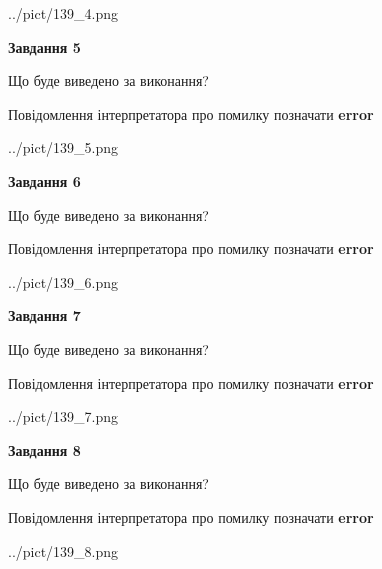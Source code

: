 \documentclass[12pt, ukrainian]{article}
\begin{document}
{\begin{center}
	{../pict/139_4.png}
\end{center}
\newpage

{\begin {center}\textbf{Завдання 5}\end {center}}\par
Що буде виведено за виконання? \par
Повідомлення інтерпретатора про помилку позначати \textbf{error}

\begin{center}
	{../pict/139_5.png}
\end{center}
\newpage

{\begin {center}\textbf{Завдання 6}\end {center}}\par
Що буде виведено за виконання? \par
Повідомлення інтерпретатора про помилку позначати \textbf{error}

\begin{center}
	{../pict/139_6.png}
\end{center}
\newpage

{\begin {center}\textbf{Завдання 7}\end {center}}\par
Що буде виведено за виконання? \par
Повідомлення інтерпретатора про помилку позначати \textbf{error}

\begin{center}
	{../pict/139_7.png}
\end{center}
\newpage

{\begin {center}\textbf{Завдання 8}\end {center}}\par
Що буде виведено за виконання? \par
Повідомлення інтерпретатора про помилку позначати \textbf{error}

\begin{center}
	{../pict/139_8.png}
\end{center}
\newpage

}
\end{document}

